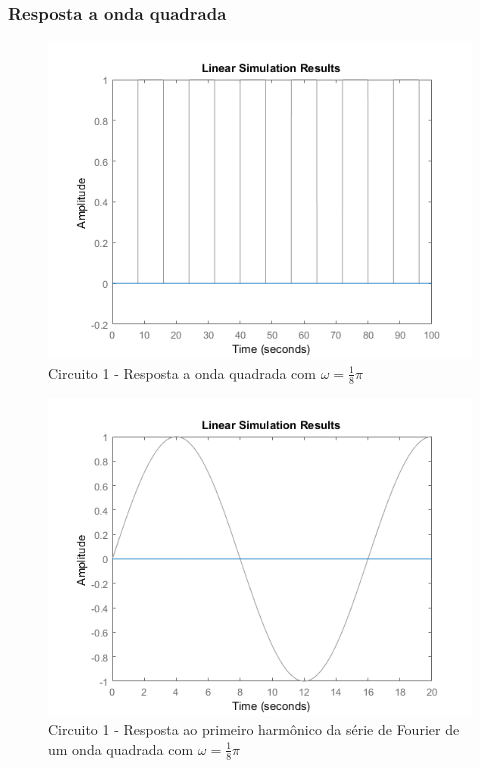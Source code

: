\documentclass[a4paper, 12pt]{article}
\begin{document}
			\subsubsection{Resposta a onda quadrada}
			\begin{figure}[!ht]
				\centering
				\includegraphics[scale=0.71]{img/1i_circ1.png}
				\caption{Circuito 1 - Resposta a onda quadrada com $\omega = \frac{1}{8}\pi$}
			\end{figure}
			\begin{figure}[!ht]
				\centering
				\includegraphics[scale=0.71]{img/1j_circ1.png}
				\caption{Circuito 1 - Resposta ao primeiro harmônico da série de Fourier de um onda quadrada com $\omega = \frac{1}{8}\pi$}
			\end{figure}
\end{document}
